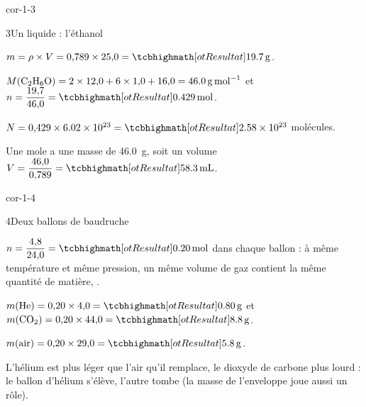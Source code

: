 \begin{blocLivre}{cor-1-3}
\begin{corrige}{3}{Un liquide : l'éthanol}
\begin{questions}
\item $m=\rho\times V=0{,}789\times25{,}0=\res{\qty{19,7}{g}}$.
\item $M(\ce{C2H6O})=2\times12{,}0+6\times1{,}0+16{,}0=\qty{46,0}{g.mol^{-1}}$ et $n=\dfrac{19{,}7}{46{,}0}=\res{\qty{0,429}{mol}}$.
\item $N=0{,}429\times\num{6.02e23}=\res{\num{2.58e23}}$ molécules.
\item Une mole a une masse de \qty{46,0}{g}, soit un volume $V=\dfrac{46{,}0}{0{,}789}=\res{\qty{58,3}{mL}}$.
\end{questions}
\end{corrige}
\end{blocLivre}
\begin{blocLivre}{cor-1-4}
\begin{corrige}{4}{Deux ballons de baudruche}
\begin{questions}
\item $n=\dfrac{4{,}8}{24{,}0}=\res{\qty{0,20}{mol}}$ dans chaque ballon : à même température et même pression, un même volume de gaz contient
la même quantité de matière, .
\item $m(\ce{He})=0{,}20\times4{,}0=\res{\qty{0,80}{g}}$ et $m(\ce{CO2})=0{,}20\times44{,}0=\res{\qty{8,8}{g}}$.
\item $m(\text{air})=0{,}20\times29{,}0=\res{\qty{5,8}{g}}$.
\item L'hélium est plus léger que l'air qu'il remplace, le dioxyde de carbone plus lourd : le ballon d'hélium s'élève, l'autre
tombe (la masse de l'enveloppe joue aussi un rôle).
\end{questions}
\end{corrige}
\end{blocLivre}
